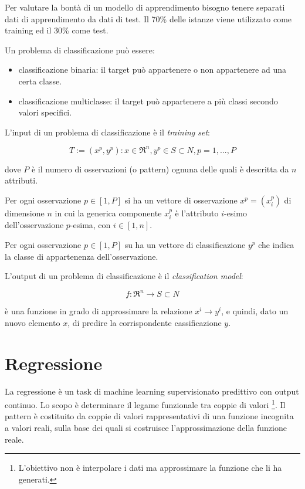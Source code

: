 Per valutare la bontà di un modello di apprendimento bisogno tenere separati dati di apprendimento da dati di test.
Il 70\% delle istanze viene utilizzato come training ed il 30\% come test.

Un problema di classificazione può essere:

\begin{itemize}
  \item classificazione binaria: il target può appartenere o non appartenere ad una certa classe.
  \item classificazione multiclasse: il target può appartenere a più classi secondo valori specifici.
\end{itemize}

L'input di un problema di classificazione è il \textit{training set}:

\begin{equation}
  \label{eqn:machine-learning.training-set}
  T:={(x^p,y^p): x\in\Re^{n},y^{p}\in S\subset N, p=1,...,P}
\end{equation}

dove $P$ è il numero di osservazioni (o pattern) ognuna delle quali è descritta da $n$ attributi.

Per ogni osservazione $p\in[1,P]$ si ha un vettore di osservazione $x^{p}=(x_{i}^{p})$ di dimensione $n$ in cui la generica componente $x_{i}^{p}$ è l'attributo $i$-esimo dell'osservazione $p$-esima, con $i\in[1,n]$.

Per ogni osservazione $p\in[1,P]$ su ha un vettore di classificazione $y^{p}$ che indica la classe di appartenenza dell'osservazione.

L'output di un problema di classificazione è il \textit{classification model}:

\begin{equation}
  \label{eqn:machine-learning.classification-model}
  f:\Re^{n}\rightarrow S\subset N
\end{equation}

è una funzione in grado di approssimare la relazione $x^{i}\rightarrow y^{i}$, e quindi, dato un nuovo elemento $x$, di predire la corrispondente cassificazione $y$.

\section{Regressione}
\label{Sec:machine-learning.regression}
La regressione è un task di machine learning supervisionato predittivo con output continuo. Lo scopo è determinare il legame funzionale tra coppie di valori \footnote{L'obiettivo non è interpolare i dati ma approssimare la funzione che li ha generati.}.
Il pattern è costituito da coppie di valori rappresentativi di una funzione incognita a valori reali, sulla base dei quali si costruisce l'approssimazione della funzione reale.

